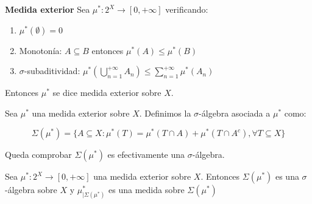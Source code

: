 \begin{definition} \textbf{Medida exterior}
 Sea $\mu^\ast : 2^X \rightarrow [0, +\infty]$ verificando:
 
 \begin{enumerate}[i]
  \item $\mu^\ast(\emptyset) = 0$
  \item Monotonía: $A\subseteq B$ entonces $\mu^\ast(A) \le \mu^\ast(B)$
  \item $\sigma$-subaditividad: $\mu^\ast \left(\bigcup_{n=1}^{+\infty} A_n \right) \le \sum_{n=1}^{+\infty} \mu^\ast (A_n)$
 \end{enumerate}
 
 Entonces $\mu^\ast$ se dice medida exterior sobre $X$.
\end{definition}

\begin{definition}
 Sea $\mu^\ast$ una medida exterior sobre $X$. Definimos la $\sigma$-álgebra asociada a $\mu^\ast$ como:
 
 \[\Sigma(\mu^\ast) = \{A\subseteq X: \mu^\ast(T) = \mu^\ast(T\cap A) + \mu^\ast(T\cap A^c), \forall T\subseteq X\}\]
\end{definition}

Queda comprobar $\Sigma(\mu^\ast)$ es efectivamente una $\sigma$-álgebra.

\begin{theorem}
 Sea $\mu^\ast : 2^X \rightarrow [0, +\infty]$ una medida exterior sobre $X$. Entonces $\Sigma(\mu^\ast)$
 es una $\sigma$-álgebra sobre $X$ y $\mu^\ast_{|\Sigma(\mu^\ast)}$ es una medida sobre $\Sigma(\mu^\ast)$
 
 \label{th:outer-to-measure}
\end{theorem}

